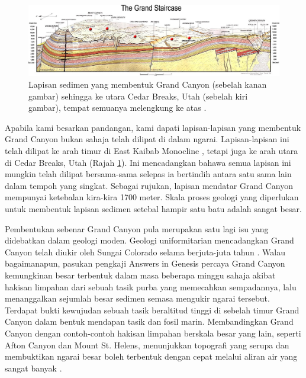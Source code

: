\documentclass[10pt,twocolumn,letterpaper]{article}
\begin{document}
\begin{figure}
\begin{center}
\includegraphics[width=1\textwidth]{Grand_Staircase-big.jpg}
\end{center}
   \caption{Lapisan sedimen yang membentuk Grand Canyon (sebelah kanan gambar) sehingga ke utara Cedar Breaks, Utah (sebelah kiri gambar), tempat semuanya melengkung ke atas \cite{50}.}
\label{fig:4}
\end{figure}

Apabila kami besarkan pandangan, kami dapati lapisan-lapisan yang membentuk Grand Canyon bukan sahaja telah dilipat di dalam ngarai. Lapisan-lapisan ini telah dilipat ke arah timur di East Kaibab Monocline \cite{46}, tetapi juga ke arah utara di Cedar Breaks, Utah (Rajah \ref{fig:4}). Ini mencadangkan bahawa semua lapisan ini mungkin telah dilipat bersama-sama selepas ia bertindih antara satu sama lain dalam tempoh yang singkat. Sebagai rujukan, lapisan mendatar Grand Canyon mempunyai ketebalan kira-kira 1700 meter. Skala proses geologi yang diperlukan untuk membentuk lapisan sedimen setebal hampir satu batu adalah sangat besar.

Pembentukan sebenar Grand Canyon pula merupakan satu lagi isu yang didebatkan dalam geologi moden. Geologi uniformitarian mencadangkan Grand Canyon telah diukir oleh Sungai Colorado selama berjuta-juta tahun \cite{47}. Walau bagaimanapun, pasukan pengkaji Answers in Genesis percaya Grand Canyon kemungkinan besar terbentuk dalam masa beberapa minggu sahaja akibat hakisan limpahan dari sebuah tasik purba yang memecahkan sempadannya, lalu menanggalkan sejumlah besar sedimen semasa mengukir ngarai tersebut. Terdapat bukti kewujudan sebuah tasik beraltitud tinggi di sebelah timur Grand Canyon dalam bentuk mendapan tasik dan fosil marin. Membandingkan Grand Canyon dengan contoh-contoh hakisan limpahan berskala besar yang lain, seperti Afton Canyon dan Mount St. Helens, menunjukkan topografi yang serupa dan membuktikan ngarai besar boleh terbentuk dengan cepat melalui aliran air yang sangat banyak \cite{48}.
\end{document}
